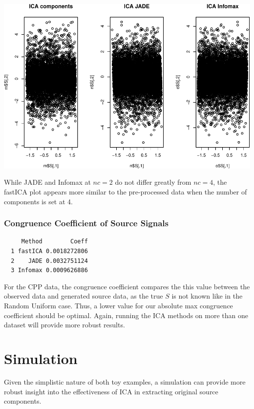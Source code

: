 \documentclass[12pt,twoside]{amherstthesis}
\begin{document}
  \begin{center}\includegraphics{ICAStatsComps_files/figure-latex/unnamed-chunk-10-1} \end{center}
  
  While JADE and Infomax at \(nc=2\) do not differ greatly from \(nc=4\),
  the fastICA plot appears more similar to the pre-processed data when the
  number of components is set at 4.
  
  \subsubsection{Congruence Coefficient of Source
  Signals}\label{congruence-coefficient-of-source-signals}
  
  \begin{verbatim}
     Method        Coeff
  1 fastICA 0.0018272806
  2    JADE 0.0032751124
  3 Infomax 0.0009626886
  \end{verbatim}
  
  For the CPP data, the congruence coefficient compares the this value
  between the observed data and generated source data, as the true \(S\)
  is not known like in the Random Uniform case. Thus, a lower value for
  our absolute max congruence coefficient should be optimal. Again,
  running the ICA methods on more than one dataset will provide more
  robust results.
  
  \section{Simulation}\label{simulation}
  
  Given the simplistic nature of both toy examples, a simulation can
  provide more robust insight into the effectiveness of ICA in extracting
  original source components.
  
\end{document}
